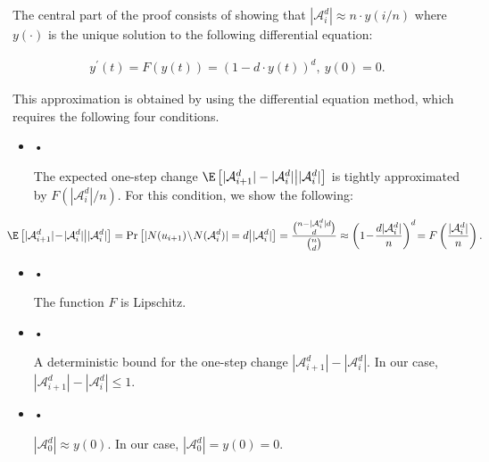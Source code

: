 \documentclass[10pt,a4paper]{article}
\begin{document}
The central part of the proof consists of showing that $|\mathcal{A}^{d}_{i}|\approx n\cdot y(i/n)$ where $y(\cdot)$ is the unique solution to the following differential equation:\par


\[\begin{gathered}
\displaystyle y^{\prime}(t)=F(y(t))=\left(1-d\cdot y(t)\right)^{d},\ y(0)=0.
\end{gathered}\]




This approximation is obtained by using the differential equation method, which requires the following four conditions.\par


\begin{itemize}


\item[] • 


The expected one-step change $\E\left[|\mathcal{A}^{d}_{i+1}|-|\mathcal{A}^{d}_{i}|\middle||\mathcal{A}^{d}_{i}|\right]$ is tightly approximated by $F\left(|\mathcal{A}^{d}_{i}|/n\right)$. For this condition, we show the following:\par


\[\begin{gathered}
\displaystyle\hskip-25.6073pt\E\left[|\mathcal{A}^{d}_{i+1}|\!-\!|\mathcal{A}^{d}_{i}|\middle||\mathcal{A}^{d}_{i}|\right]=\Pr\left[|N(u_{i+1})\!\setminus\!N(\mathcal{A}^{d}_{i})|=d\middle||\mathcal{A}^{d}_{i}|\right]=\frac{\binom{n-|\mathcal{A}^{d}_{i}|d}{d}}{\binom{n}{d}}\approx\left(1\!-\!\frac{d|\mathcal{A}^{d}_{i}|}{n}\right)^{d}\!=F\left(\frac{|\mathcal{A}^{d}_{i}|}{n}\right).
\end{gathered}\]




\item[] • 


The function $F$ is Lipschitz.\par




\item[] • 


A deterministic bound for the one-step change $|\mathcal{A}^{d}_{i+1}|-|\mathcal{A}^{d}_{i}|$. In our case, $|\mathcal{A}^{d}_{i+1}|-|\mathcal{A}^{d}_{i}|\leq 1$.\par




\item[] • 


$|\mathcal{A}^{d}_{0}|\approx y(0)$. In our case, $|\mathcal{A}^{d}_{0}|=y(0)=0$.\par




\end{itemize}
\end{document}
